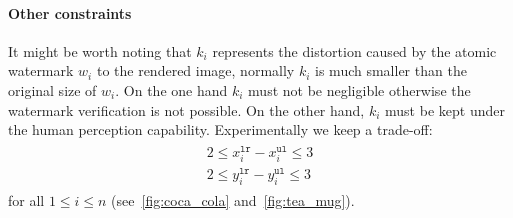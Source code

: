 \paragraph[Other constraints]{Other constraints}
It might be worth noting that $k_i$ represents the distortion caused by the atomic watermark $w_i$ to the rendered image, normally $k_i$ is much smaller than the original size of $w_i$. On the one hand $k_i$ must not be negligible otherwise the watermark verification is not possible. On the other hand, $k_i$ must be kept under the human perception capability. Experimentally we keep a trade-off:
\begin{align}\label{eq:side_constraint}
\begin{split}
    2 \leq x^{\mathtt{lr}}_{i} - x^{\mathtt{ul}}_{i} \leq 3 \\
    2 \leq y^{\mathtt{lr}}_{i} - y^{\mathtt{ul}}_{i} \leq 3
\end{split}
\end{align}
for all $1 \leq i \leq n$ (see~\autoref{fig:coca_cola} and~\autoref{fig:tea_mug}).
